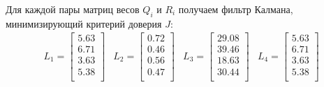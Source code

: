 Для каждой пары матриц весов $Q_i$ и $R_i$ получаем фильтр Калмана, минимизирующий критерий доверия $J$: 
\begin{equation}
    \begin{array}{ccccc}
        L_1 = 
        \begin{bmatrix}
        5.63 \\ 
        6.71 \\ 
        3.63 \\ 
        5.38 \\ 
        \end{bmatrix} & 
        L_2 = 
        \begin{bmatrix}
        0.72 \\ 
        0.46 \\ 
        0.56 \\ 
        0.47 \\ 
        \end{bmatrix} &
        L_3 = 
        \begin{bmatrix}
        29.08 \\ 
        39.46 \\ 
        18.63 \\ 
        30.44 \\ 
        \end{bmatrix} & 
        L_4 = 
        \begin{bmatrix}
        5.63 \\ 
        6.71 \\ 
        3.63 \\ 
        5.38 \\ 
        \end{bmatrix} 
    \end{array}
\end{equation}

